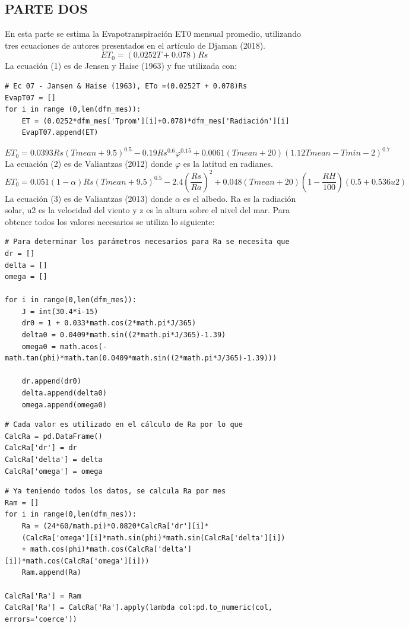 \documentclass[11pt, spanish]{report}
\begin{document}
\subsection{PARTE DOS}
En esta parte se estima la Evapotranspiración ET0 mensual promedio, utilizando tres ecuaciones de autores presentados en el artículo de Djaman (2018). \\
\begin{equation}
ET_0=(0.0252T+0.078)Rs
\end{equation}
La ecuación (1) es de Jensen y Haise (1963) y fue utilizada con:
\begin{verbatim}
# Ec 07 - Jansen & Haise (1963), ETo =(0.0252T + 0.078)Rs 
EvapT07 = []
for i in range (0,len(dfm_mes)):
    ET = (0.0252*dfm_mes['Tprom'][i]+0.078)*dfm_mes['Radiación'][i]
    EvapT07.append(ET)
\end{verbatim}
\begin{equation}
ET_0=0.0393Rs(Tmean+9.5)^{0.5}-0.19Rs^{0.6}\varphi^{0.15}+0.0061(Tmean+20)(1.12Tmean-Tmin-2)^{0.7} 
\end{equation}
La ecuación (2) es de Valiantzas (2012) donde $\varphi$ es la latitud en radianes.
\begin{equation}
ET_0=0.051(1-\alpha)Rs(Tmean+9.5)^{0.5}-2.4(\frac{Rs}{Ra})^2+0.048(Tmean+20)(1-\frac{RH}{100})(0.5+0.536u2)
\end{equation}
La ecuación (3) es de Valiantzas (2013) donde $\alpha$ es el albedo. Ra es la radiación solar, u2 es la velocidad del viento y z es la altura sobre el nivel del mar. Para obtener todos los valores necesarios se utiliza lo siguiente:
\begin{verbatim}
# Para determinar los parámetros necesarios para Ra se necesita que
dr = []
delta = []
omega = []

for i in range(0,len(dfm_mes)):
    J = int(30.4*i-15)
    dr0 = 1 + 0.033*math.cos(2*math.pi*J/365)
    delta0 = 0.0409*math.sin((2*math.pi*J/365)-1.39)
    omega0 = math.acos(-math.tan(phi)*math.tan(0.0409*math.sin((2*math.pi*J/365)-1.39)))
    
    dr.append(dr0)
    delta.append(delta0)
    omega.append(omega0)
\end{verbatim}
\begin{verbatim}
# Cada valor es utilizado en el cálculo de Ra por lo que
CalcRa = pd.DataFrame()
CalcRa['dr'] = dr
CalcRa['delta'] = delta
CalcRa['omega'] = omega
\end{verbatim}
\begin{verbatim}
# Ya teniendo todos los datos, se calcula Ra por mes
Ram = []
for i in range(0,len(dfm_mes)):
    Ra = (24*60/math.pi)*0.0820*CalcRa['dr'][i]*
    (CalcRa['omega'][i]*math.sin(phi)*math.sin(CalcRa['delta'][i])
    + math.cos(phi)*math.cos(CalcRa['delta'][i])*math.cos(CalcRa['omega'][i]))
    Ram.append(Ra)
    
CalcRa['Ra'] = Ram
CalcRa['Ra'] = CalcRa['Ra'].apply(lambda col:pd.to_numeric(col, errors='coerce'))
\end{verbatim}
\end{document}
